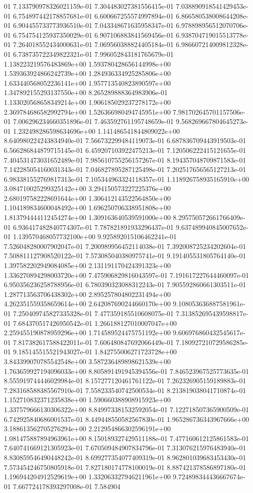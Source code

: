 01	7.133790978326021159e-01	7.304483027381556415e-01	7.038890918541429453e-01	6.754897442178857681e-01	6.600667255574997894e-01	6.866580538008644208e-01	6.904455733773936510e-01	7.043348671635958347e-01	6.978898956512070706e-01	6.754754125937350029e-01	6.907106883841569456e-01	6.938704719015513778e-01	7.264018552434000631e-01	7.069560388824405184e-01	6.986607214009812328e-01	6.738735722349822321e-01	7.996052843181765679e-01	1.138223219576483869e+00	1.593780428656144998e+00	1.539363924866242739e+00	1.284936334925285806e+00	1.633440568052236141e+00	1.957713540823890597e+00	1.347892155293137550e+00	8.265289888364983906e-01	1.133020568658349214e+00	1.906185029237278172e+00	2.369784686582992794e+00	1.526366980494745951e+00	7.981702645701157506e-01	7.006296234660351896e-01	7.463592761195748659e-01	9.568269667804645273e-01	1.232498286598634696e+00	1.141486541844809022e+00	8.640980224243834940e-01	7.566732299484119073e-01	6.687836709443919503e-01	6.566286844879715145e-01	6.459207103922475213e-01	7.120506222415121655e-01	7.404531473031652489e-01	7.985610755256157267e-01	8.194357048709871583e-01	7.142285054160031343e-01	7.046827895287125498e-01	7.202517656565127213e-01	6.983381552769817313e-01	7.105344963324118357e-01	1.118926758935165910e+00	3.084710025299325142e+00	3.294150573227225376e+00	2.680197582228691644e+00	1.306412143522564850e+00	1.104189834600048492e+00	1.696250706338951808e+00	1.813794444112454274e+00	1.309163640539591000e+00	8.295750572661766409e-01	6.936417482840774307e-01	7.787821891933296437e-01	9.637489940845007652e-01	1.139570468057732100e+00	9.925892015106462241e-01	7.526048280007902047e-01	7.200989956452114038e-01	7.392008725234202604e-01	7.508811127908520122e-01	7.573085040380975741e-01	9.191405531805764140e-01	1.397582202949084085e+00	2.131191170424391323e+00	1.336270894298003720e+00	7.475906829816043597e-01	7.191617227644460097e-01	6.950356236258788956e-01	6.780390323088312243e-01	7.905592860661303511e-01	1.287713563706438302e+00	2.895257804802231494e+00	4.262351559358659614e+00	2.642087690244660170e+00	9.108053636887581961e-01	7.250409745827335328e-01	7.477359185510608075e-01	7.313852695439598817e-01	7.684370517426950542e-01	1.266188127010007047e+00	2.259455190878959296e+00	1.714589524475751192e+00	9.606976860432545617e-01	7.817382617588422011e-01	7.606480847692066449e-01	7.180927210729586285e-01	9.185145515521943027e-01	1.842755006271723728e+00	3.843399070785542548e+00	3.587236489898621539e+00	1.763659927194096033e+00	8.805891491945394556e-01	7.846523967525773635e-01	8.555919744446029984e-01	8.157277120461761122e-01	7.262326905159189883e-01	7.283168588385567910e-01	7.558233540742500534e-01	8.213819038041710874e-01	1.152710832371235838e+00	1.590660388908915923e+00	1.337579666130306322e+00	8.849973381532592054e-01	7.122718507365900509e-01	6.742925840686001537e-01	8.449448550582567830e-01	1.965286736343967666e+00	3.188613562705276294e+00	2.212954866302596191e+00	1.081475887894963961e+00	8.150189327429511188e-01	7.477160612125861583e-01	7.640741669121305923e-01	7.670509484907834796e-01	7.313076215976483940e-01	8.830859546490448242e-01	8.699277354077409319e-01	8.962801039683453430e-01	7.573454246750805918e-01	7.827180174778100019e-01	8.887421378586897180e-01	1.196944204912529619e+00	1.332063327946211961e+00	9.724898344436667674e-01	7.667724178393297008e-01	7.584904